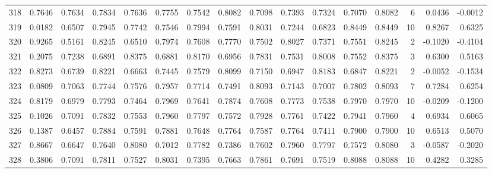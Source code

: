 \begin{tabular}{lrrrrrrrrrrrrrrr}
318 &      0.7646 &  0.7634 &  0.7834 &  0.7636 &  0.7755 &  0.7542 &  0.8082 &  0.7098 &  0.7393 &  0.7324 &   0.7070 &     0.8082 &      6 &                    0.0436 &                    -0.0012 \\
319 &      0.0182 &  0.6507 &  0.7945 &  0.7742 &  0.7546 &  0.7994 &  0.7591 &  0.8031 &  0.7244 &  0.6823 &   0.8449 &     0.8449 &     10 &                    0.8267 &                     0.6325 \\
320 &      0.9265 &  0.5161 &  0.8245 &  0.6510 &  0.7974 &  0.7608 &  0.7770 &  0.7502 &  0.8027 &  0.7371 &   0.7551 &     0.8245 &      2 &                   -0.1020 &                    -0.4104 \\
321 &      0.2075 &  0.7238 &  0.6891 &  0.8375 &  0.6881 &  0.8170 &  0.6956 &  0.7831 &  0.7531 &  0.8008 &   0.7552 &     0.8375 &      3 &                    0.6300 &                     0.5163 \\
322 &      0.8273 &  0.6739 &  0.8221 &  0.6663 &  0.7445 &  0.7579 &  0.8099 &  0.7150 &  0.6947 &  0.8183 &   0.6847 &     0.8221 &      2 &                   -0.0052 &                    -0.1534 \\
323 &      0.0809 &  0.7063 &  0.7744 &  0.7576 &  0.7957 &  0.7714 &  0.7491 &  0.8093 &  0.7143 &  0.7007 &   0.7802 &     0.8093 &      7 &                    0.7284 &                     0.6254 \\
324 &      0.8179 &  0.6979 &  0.7793 &  0.7464 &  0.7969 &  0.7641 &  0.7874 &  0.7608 &  0.7773 &  0.7538 &   0.7970 &     0.7970 &     10 &                   -0.0209 &                    -0.1200 \\
325 &      0.1026 &  0.7091 &  0.7832 &  0.7553 &  0.7960 &  0.7797 &  0.7572 &  0.7928 &  0.7761 &  0.7422 &   0.7941 &     0.7960 &      4 &                    0.6934 &                     0.6065 \\
326 &      0.1387 &  0.6457 &  0.7884 &  0.7591 &  0.7881 &  0.7648 &  0.7764 &  0.7587 &  0.7764 &  0.7411 &   0.7900 &     0.7900 &     10 &                    0.6513 &                     0.5070 \\
327 &      0.8667 &  0.6647 &  0.7640 &  0.8080 &  0.7012 &  0.7782 &  0.7386 &  0.7602 &  0.7960 &  0.7797 &   0.7572 &     0.8080 &      3 &                   -0.0587 &                    -0.2020 \\
328 &      0.3806 &  0.7091 &  0.7811 &  0.7527 &  0.8031 &  0.7395 &  0.7663 &  0.7861 &  0.7691 &  0.7519 &   0.8088 &     0.8088 &     10 &                    0.4282 &                     0.3285 \\

\end{tabular}
